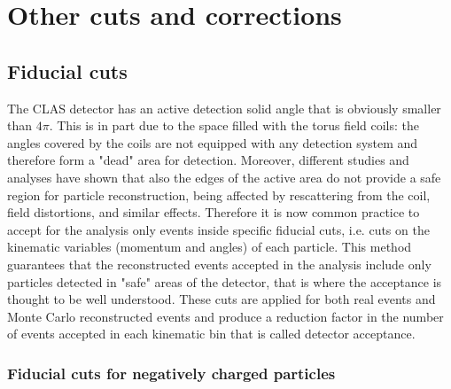 \chapter{Other cuts and corrections}
\label{other}

\section{Fiducial cuts}
\label{fiduc} The CLAS detector has an active detection solid angle
that is obviously smaller than $4\pi$. This is in part due to the space filled with
the torus field coils: the angles covered by the coils are not
equipped with any detection system and therefore form a "dead" area
for detection. Moreover, different studies and analyses have shown
that also the edges of the active area do not provide a safe region
for particle reconstruction, being affected by rescattering from the
coil, field distortions, and similar effects. Therefore it is now
common practice to accept for the analysis only events inside
specific fiducial cuts, i.e. cuts on the kinematic variables
(momentum and angles) of each particle. This method guarantees that the
reconstructed events accepted in the analysis include only particles
detected in "safe" areas of the detector, that is where the
acceptance is thought to be well understood. These cuts are applied for both real events and Monte Carlo reconstructed events and produce a
reduction factor in the number of events accepted in each kinematic
bin that is called detector acceptance.

\subsection{Fiducial cuts for negatively charged particles}
\label{fiduch_nagative}

